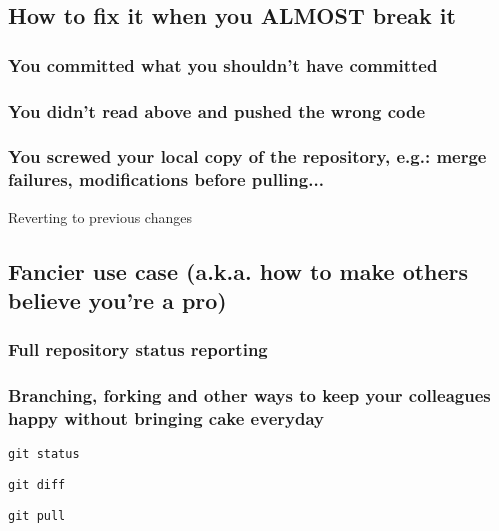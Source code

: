 \documentclass[runningheads,a4paper]{llncs}
\begin{document}
\subsection{How to fix it when you ALMOST break it}

\subsubsection{You committed what you shouldn't have committed\newline}
\subsubsection{You didn't read above and pushed the wrong code\newline}
\subsubsection{You screwed your local copy of the repository, e.g.: merge failures, modifications before pulling...\newline}

Reverting to previous changes
\subsection{Fancier use case (a.k.a. how to make others believe you're a pro)}

\subsubsection{Full repository status reporting}

\newline

\newline

\newline

\subsubsection{Branching, forking and other ways to keep your colleagues happy without bringing cake everyday}



\texttt{git status}

\texttt{git diff}


\texttt{git pull}
\end{document}
